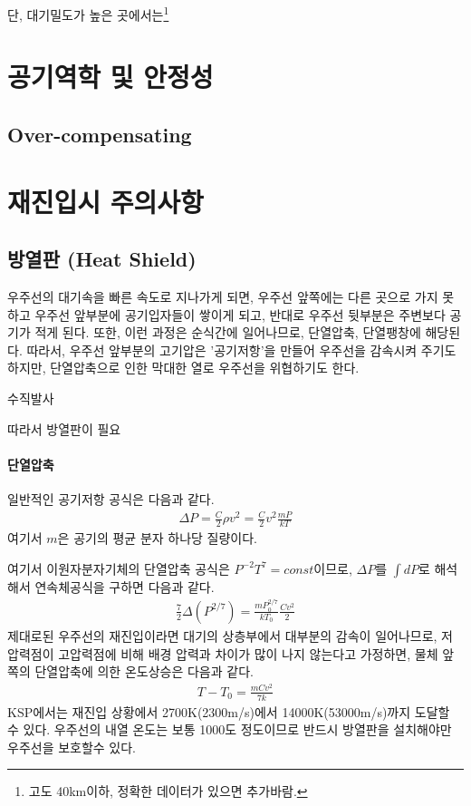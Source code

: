 \documentclass[9pt]{amsbook}
\begin{document}

단, 대기밀도가 높은 곳에서는\footnote{고도 40km이하, 정확한 데이터가 있으면 추가바람.}

\section{공기역학 및 안정성}



\subsection{Over-compensating}
\section{재진입시 주의사항}
\subsection{방열판 (Heat Shield)}
우주선의 대기속을 빠른 속도로 지나가게 되면, 우주선 앞쪽에는 다른 곳으로 가지 못하고 우주선 앞부분에 공기입자들이 쌓이게 되고, 반대로 우주선 뒷부분은 주변보다 공기가 적게 된다. 또한, 이런 과정은 순식간에 일어나므로, 단열압축, 단열팽창에 해당된다. 따라서, 우주선 앞부분의 고기압은 '공기저항'을 만들어 우주선을 감속시켜 주기도 하지만, 단열압축으로 인한 막대한 열로 우주선을 위협하기도 한다.

수직발사

따라서 방열판이 필요

\paragraph{단열압축}
일반적인 공기저항 공식은 다음과 같다.
\begin{align}
\Delta P = \frac{C}{2} \rho v^2 = \frac{C}{2} v^2\frac{m P}{kT}
\end{align}
여기서 $m$은 공기의 평균 분자 하나당 질량이다.

여기서 이원자분자기체의 단열압축 공식은 $P^{-2}T^7=const$이므로, $\Delta P$를 $\int dP$로 해석해서 연속체공식을 구하면 다음과 같다.
\begin{align}
	\frac{7}{2}\Delta(P^{2/7}) = \frac{mP_0^{2/7}}{kT_0} \frac{Cv^2}{2}
\end{align}
제대로된 우주선의 재진입이라면 대기의 상층부에서 대부분의 감속이 일어나므로, 저압력점이 고압력점에 비해 배경 압력과 차이가 많이 나지 않는다고 가정하면, 물체 앞쪽의 단열압축에 의한 온도상승은 다음과 같다.
\begin{align}
T-T_0 = \frac{mCv^2}{7k}
\end{align}
KSP에서는 재진입 상황에서 2700K(2300m/s)에서 14000K(53000m/s)까지 도달할 수 있다. 우주선의 내열 온도는 보통 1000도 정도이므로 반드시 방열판을 설치해야만 우주선을 보호할수 있다.
\end{document}
